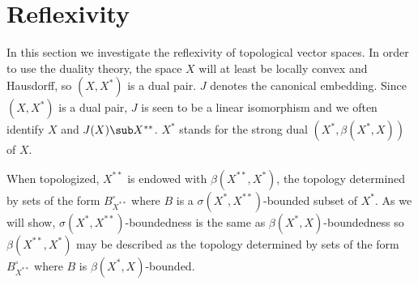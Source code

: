 \chapter{Reflexivity}
In this section we investigate the reflexivity of topological vector spaces. In order to use the duality theory, the space $X$ will at least be locally convex and Hausdorff, so $(X,X^*)$ is a dual pair. $J$ denotes the canonical embedding. Since $(X,X^*)$ is a dual pair, $J$ is seen to be a linear isomorphism and we often identify $X$ and $J(X)\sub X^{**}$. $X^*$ stands for the strong dual $(X^*,\beta(X^*,X))$ of $X$.\par
When topologized, $X^{**}$ is endowed with $\beta(X^{**},X^*)$, the topology determined by sets of the form $B^\circ_{X^{**}}$ where $B$ is a $\sigma(X^*,X^{**})$-bounded subset of $X^*$. As we will show, $\sigma(X^*,X^{**})$-boundedness is the same as $\beta(X^*,X)$-boundedness so $\beta(X^{**},X^*)$ may be described as the topology determined by sets of the form $B^\circ_{X^{**}}$ where $B$ is $\beta(X^*,X)$-bounded.
